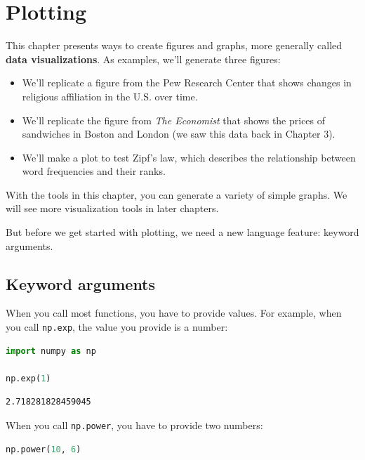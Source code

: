 \hypertarget{plotting}{%
\chapter{Plotting}\label{plotting}}

This chapter presents ways to create figures and graphs, more generally
called \textbf{data visualizations}. As examples, we'll generate three
figures:

\begin{itemize}
\item
  We'll replicate a figure from the Pew Research Center that shows
  changes in religious affiliation in the U.S. over time.
\item
  We'll replicate the figure from \emph{The Economist} that shows the
  prices of sandwiches in Boston and London (we saw this data back in
  Chapter 3).
\item
  We'll make a plot to test Zipf's law, which describes the relationship
  between word frequencies and their ranks.
\end{itemize}

With the tools in this chapter, you can generate a variety of simple
graphs. We will see more visualization tools in later chapters.

But before we get started with plotting, we need a new language feature:
keyword arguments.

\hypertarget{keyword-arguments}{%
\section{Keyword arguments}\label{keyword-arguments}}

When you call most functions, you have to provide values. For example,
when you call \passthrough{\lstinline!np.exp!}, the value you provide is
a number:

\begin{lstlisting}[language=Python]
import numpy as np

np.exp(1)
\end{lstlisting}

\begin{lstlisting}[]
2.718281828459045
\end{lstlisting}

When you call \passthrough{\lstinline!np.power!}, you have to provide
two numbers:

\begin{lstlisting}[language=Python]
np.power(10, 6)
\end{lstlisting}

